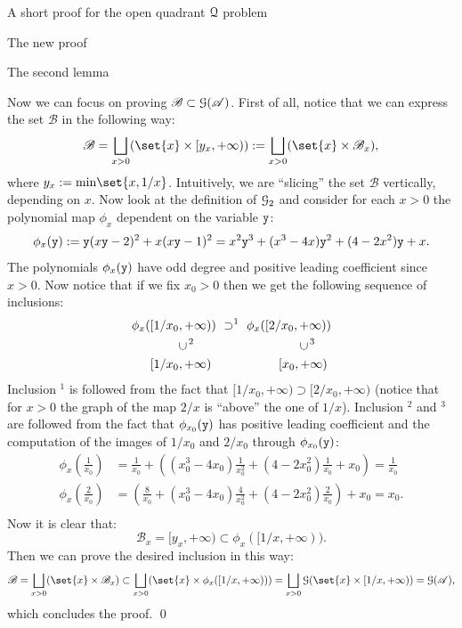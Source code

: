 \documentclass[11pt, a4paper, english, twoside, notitlepage, openright]{report}
\begin{document}
\begin{chapter}{A short proof for the open quadrant $\mathcal{Q}$ problem}
\begin{section}{The new proof}
\begin{subsection}{The second lemma}
\begin{lemma}
\begin{Proof}
Now we can focus on proving $\mathscr{B} \subset \mathcal{G}(\mathscr{A})$. First of all, notice that we can express the set $\mathscr{B}$ in the following way:
$$
\mathscr{B} = \bigsqcup_{x>0}(\set{x} \times [y_x, +\infty)) := \bigsqcup_{x>0}(\set{x} \times \mathscr{B}_x),
$$
where $y_x := \text{min}\set{x, 1/x}$. Intuitively, we are ``slicing'' the set $\mathscr{B}$ vertically, depending on $x$. Now look at the definition of $\mathcal{G}_2$ and consider for each $x > 0$ the polynomial map $\phi_x$ dependent on the variable ${\tt y}$:
$$
\phi_x({\tt y}) := {\tt y}(x{\tt y} - 2)^2 + x (x{\tt y} - 1)^2 = x^2{\tt y}^3 + (x^3 - 4x){\tt y}^2 + (4 - 2x^2){\tt y} + x.
$$
The polynomials $\phi_x({\tt y})$ have odd degree and positive leading coefficient since $x > 0$. Now notice that if we fix $x_0 > 0$ then we get the following sequence of inclusions:
\begin{equation*}
\begin{aligned}
\phi_x(&[1/x_0, +\infty))\ \supset ^1 \  \phi_x([2/x_0, +\infty))\\
&\quad \quad \ \rotatebox[origin=c]{90}{$\subset$}\, ^2  \hspace{3cm} \rotatebox[origin=c]{90}{$\subset$}\, ^3\\
&[1/x_0, +\infty) \hspace{1.9cm} [x_0, +\infty) \\
\end{aligned}
\end{equation*}
Inclusion $^1$ is followed from the fact that $[1/x_0, +\infty) \supset [2/x_0, +\infty)$ (notice that for $x>0$ the graph of the map $2/x$ is ``above'' the one of $1/x$). Inclusion $^2$ and $^3$ are followed from the fact that $\phi_{x_0}({\tt y})$ has positive leading coefficient and the computation of the images of $1/x_0$ and $2/x_0$ through $\phi_{x_0}({\tt y})$:
\begin{equation*}
\begin{aligned}
\phi_x\left(\frac{1}{x_0}\right)& = \frac{1}{x_0} + \left((x_0^3 - 4x_0)\frac{1}{x_0^2} + (4 - 2x_0^2)\frac{1}{x_0} + x_0\right) = \frac{1}{x_0}\\
\phi_x\left(\frac{2}{x_0}\right)& = \left(\frac{8}{x_0} + (x_0^3 - 4x_0)\frac{4}{x_0^2} + (4 - 2x_0^2)\frac{2}{x_0}\right) + x_0 = x_0.\\
\end{aligned}
\end{equation*}
Now it is clear that:
$$
\mathscr{B}_x = [y_x, +\infty) \subset \phi_x([1/x, +\infty)).
$$
Then we can prove the desired inclusion in this way:
$$
\mathscr{B} = \bigsqcup_{x>0}(\set{x} \times \mathscr{B}_x) \subset \bigsqcup_{x>0}(\set{x} \times \phi_x([1/x, +\infty))) = \bigsqcup_{x>0}\GG(\set{x} \times [1/x, +\infty)) = \GG(\mathscr{A}),
$$
which concludes the proof.
\qed
\end{Proof}
\end{lemma}
\end{subsection}


\end{section}
\end{chapter}
\end{document}
